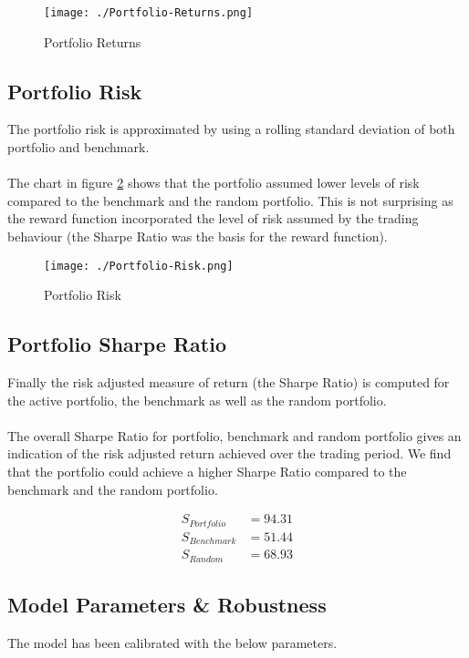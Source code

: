 \documentclass[dvips,12pt]{article}
\begin{document}
\begin{figure}
  \texttt{[image: ./Portfolio-Returns.png]}
  \caption{Portfolio Returns}
  \label{fig:portfolio_returns}
\end{figure}

\subsection{Portfolio Risk}
The portfolio risk is approximated by using a rolling standard deviation of both portfolio and benchmark.
\\\\
The chart in figure \ref{fig:portfolio_risk} shows that the portfolio assumed lower levels of risk compared to the benchmark and the random portfolio. This is not surprising as the reward function incorporated the level of risk assumed by the trading behaviour (the Sharpe Ratio was the basis for the reward function).

\begin{figure}
  \texttt{[image: ./Portfolio-Risk.png]}
  \caption{Portfolio Risk}
  \label{fig:portfolio_risk}
\end{figure}

\subsection{Portfolio Sharpe Ratio}
Finally the risk adjusted measure of return (the Sharpe Ratio) is computed for the active portfolio, the benchmark as well as the random portfolio. 
\\\\
The overall Sharpe Ratio for portfolio, benchmark and random portfolio gives an indication of the risk adjusted return achieved over the trading period. We find that the portfolio could achieve a higher Sharpe Ratio compared to the benchmark and the random portfolio.

\begin{align}
	S_{Portfolio} &= 94.31 \\
	S_{Benchmark} &= 51.44 \\
	S_{Random} &= 68.93
\end{align}

\subsection{Model Parameters \& Robustness}
The model has been calibrated with the below parameters.
\end{document}
